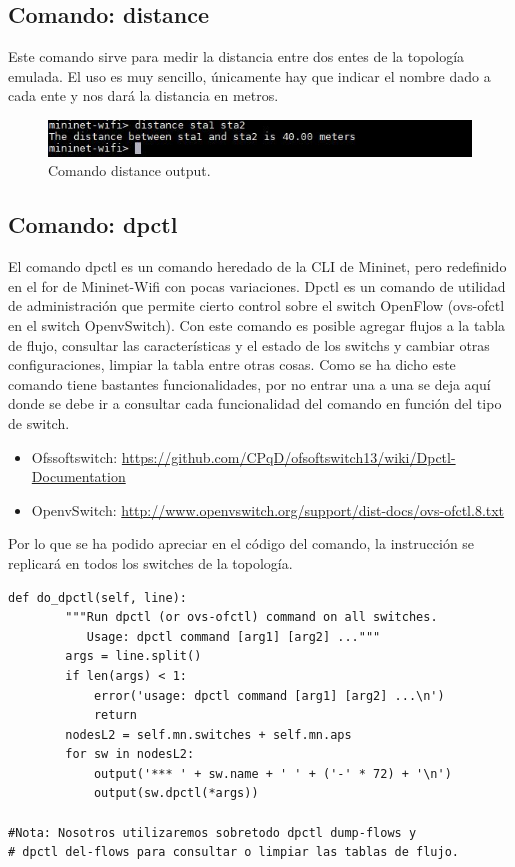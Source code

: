  \subsection{Comando: distance}
 Este comando sirve para medir la distancia entre dos entes de la topología emulada. El uso es muy sencillo, únicamente hay que indicar el nombre dado a cada ente y nos dará la distancia en metros. 
 
 \begin{figure}[!htb]
  \centering
    \includegraphics[width=0.8\linewidth]{./img/cli/1.JPG}
    \caption{Comando distance output.}
  \label{fig:yo}
\end{figure}


\subsection{Comando: dpctl}
El comando dpctl es un comando heredado de la CLI de Mininet, pero redefinido en el for de Mininet-Wifi con pocas variaciones. Dpctl es un comando de utilidad de administración que permite cierto control sobre el switch OpenFlow (ovs-ofctl en el switch OpenvSwitch). Con este comando es posible agregar flujos a la tabla de flujo, consultar las características y el estado de los switchs y cambiar otras configuraciones, limpiar la tabla entre otras cosas. \newline
\newline
Como se ha dicho este comando tiene bastantes funcionalidades, por no entrar una a una se deja aquí donde se debe ir a consultar cada funcionalidad del comando en función del tipo de switch.
\begin{itemize}
    \item Ofssoftswitch: \url{https://github.com/CPqD/ofsoftswitch13/wiki/Dpctl-Documentation}
    \item OpenvSwitch: \url{http://www.openvswitch.org/support/dist-docs/ovs-ofctl.8.txt}
\end{itemize}
Por lo que se ha podido apreciar en el código del comando, la instrucción se replicará en todos los switches de la topología.
\begin{verbatim}
def do_dpctl(self, line):
        """Run dpctl (or ovs-ofctl) command on all switches.
           Usage: dpctl command [arg1] [arg2] ..."""
        args = line.split()
        if len(args) < 1:
            error('usage: dpctl command [arg1] [arg2] ...\n')
            return
        nodesL2 = self.mn.switches + self.mn.aps
        for sw in nodesL2:
            output('*** ' + sw.name + ' ' + ('-' * 72) + '\n')
            output(sw.dpctl(*args))
            
#Nota: Nosotros utilizaremos sobretodo dpctl dump-flows y 
# dpctl del-flows para consultar o limpiar las tablas de flujo.
\end{verbatim}

